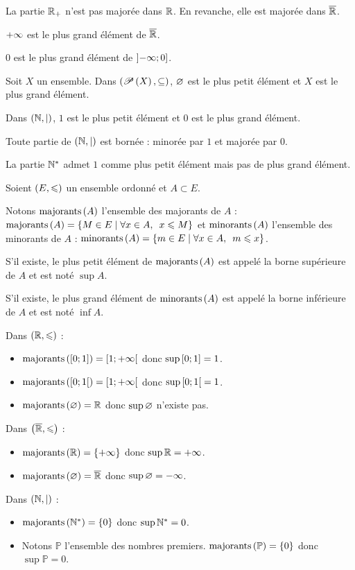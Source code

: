 \begin{ex}
La partie \(\mathbb{R}_+\) n'est pas majorée dans \(\mathbb{R}\). En revanche, elle est majorée dans \(\overline{\mathbb{R}}\).

\(+\infty\) est le plus grand élément de \(\overline{\mathbb{R}}\).

\(0\) est le plus grand élément de \(\left]-\infty;0\right]\).

Soit \(X\) un ensemble. Dans \(\left(\mathscr{P}\left(X\right),\subseteq\right)\), \(\varnothing\) est le plus petit élément et \(X\) est le plus grand élément.

Dans \(\left(\mathbb{N},\mid\right)\), \(1\) est le plus petit élément et \(0\) est le plus grand élément.

Toute partie de \(\left(\mathbb{N},\mid\right)\) est bornée : minorée par \(1\) et majorée par \(0\).

La partie \(\mathbb{N}^*\) admet \(1\) comme plus petit élément mais pas de plus grand élément.
\end{ex}

\begin{defi}
Soient \(\left(E,\leqslant\right)\) un ensemble ordonné et \(A\subset E\).

Notons \(\mathrm{majorants}\left(A\right)\) l'ensemble des majorants de \(A\) : \(\majo{A}=\accol{M\in E\tq\quantifs{\forall x\in A}x\leq M}\) et \(\mathrm{minorants}\left(A\right)\) l'ensemble des minorants de \(A\) : \(\mino{A}=\accol{m\in E\tq\quantifs{\forall x\in A}m\leq x}\).

S'il existe, le plus petit élément de \(\mathrm{majorants}\left(A\right)\) est appelé la borne supérieure de \(A\) et est noté \(\sup A\).

S'il existe, le plus grand élément de \(\mathrm{minorants}\left(A\right)\) est appelé la borne inférieure de \(A\) et est noté \(\inf A\).
\end{defi}

\begin{ex}
Dans \(\left(\mathbb{R},\leqslant\right)\) : \begin{itemize}
\item \(\mathrm{majorants}\left(\left[0;1\right]\right)=\left[1;+\infty\right[\) donc \(\sup\left[0;1\right]=1\).

\item \(\mathrm{majorants}\left(\left[0;1\right[\right)=\left[1;+\infty\right[\) donc \(\sup\left[0;1\right[=1\).

\item \(\mathrm{majorants}\left(\varnothing\right)=\mathbb{R}\) donc \(\sup\varnothing\) n'existe pas.
\end{itemize}

Dans \(\left(\overline{\mathbb{R}},\leqslant\right)\) : \begin{itemize}
\item \(\mathrm{majorants}\left(\mathbb{R}\right)=\left\lbrace+\infty\right\rbrace\) donc \(\sup\mathbb{R}=+\infty\).

\item \(\mathrm{majorants}\left(\varnothing\right)=\overline{\mathbb{R}}\) donc \(\sup\varnothing=-\infty\).
\end{itemize}

Dans \(\left(\mathbb{N},\mid\right)\) : \begin{itemize}
\item \(\mathrm{majorants}\left(\mathbb{N}^*\right)=\left\lbrace0\right\rbrace\) donc \(\sup\mathbb{N}^*=0\).

\item Notons \(\mathbb{P}\) l'ensemble des nombres premiers. \(\mathrm{majorants}\left(\mathbb{P}\right)=\left\lbrace0\right\rbrace\) donc \(\sup\mathbb{P}=0\).
\end{itemize}
\end{ex}

